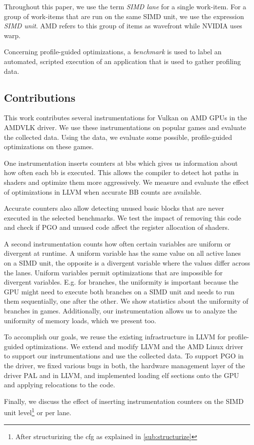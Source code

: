 Throughout this paper, we use the term \emph{SIMD lane} for a single work-item.
For a group of work-items that are run on the same SIMD unit, we use the expression \emph{SIMD unit}.
AMD refers to this group of items as wavefront while NVIDIA uses warp.

Concerning profile-guided optimizations, a \emph{benchmark} is used to label an automated, scripted execution of an application that is used to gather profiling data.


\subsection{Contributions}
\label{sub:contributions}
This work contributes several instrumentations for Vulkan on AMD GPUs in the AMDVLK driver.
We use these instrumentations on popular games and evaluate the collected data. Using the data, we evaluate some possible, profile-guided optimizations on these games.

One instrumentation inserts counters at \glspl{bb} which gives us information about how often each \gls{bb} is executed.
This allows the compiler to detect hot paths in shaders and optimize them more aggressively.
We measure and evaluate the effect of optimizations in LLVM when accurate BB counts are available.

Accurate counters also allow detecting unused basic blocks that are never executed in the selected benchmarks. We test the impact of removing this code and check if PGO and unused code affect the register allocation of shaders.

A second instrumentation counts how often certain variables are uniform or divergent at runtime. A uniform variable has the same value on all active lanes on a SIMD unit, the opposite is a divergent variable where the values differ across the lanes.
Uniform variables permit optimizations that are impossible for divergent variables.
E.g. for branches, the uniformity is important because the GPU might need to execute both branches on a SIMD unit and needs to run them sequentially, one after the other.
We show statistics about the uniformity of branches in games.
Additionally, our instrumentation allows us to analyze the uniformity of memory loads, which we present too.

To accomplish our goals, we reuse the existing infrastructure in LLVM for profile-guided optimizations.
We extend and modify LLVM and the AMD Linux driver to support our instrumentations and use the collected data.
To support PGO in the driver, we fixed various bugs in both, the hardware management layer of the driver PAL and in LLVM, and implemented loading \gls{elf} sections onto the GPU and applying relocations to the code.

Finally, we discuss the effect of inserting instrumentation counters on the SIMD unit level\footnote{After structurizing the \gls{cfg} as explained in \cref{sub:structurize}} or per lane.
